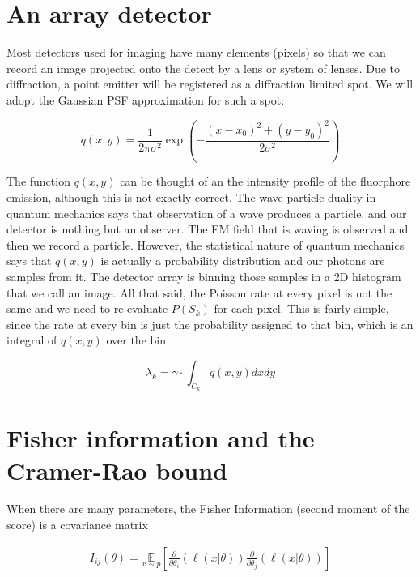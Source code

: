\documentclass{article}
\begin{document}
\section{An array detector}

Most detectors used for imaging have many elements (pixels) so that we can record an image projected onto the detect by a lens or system of lenses. Due to diffraction, a point emitter will be registered as a diffraction limited spot. We will adopt the Gaussian PSF approximation for such a spot:

\begin{equation*}
q(x,y) = \frac{1}{2\pi\sigma^{2}}\exp\left(-\frac{(x-x_{0})^{2}+(y-y_{0})^{2}}{2\sigma^{2}}\right)
\end{equation*}

The function $q(x,y)$ can be thought of an the intensity profile of the fluorphore emission, although this is not exactly correct. The wave particle-duality in quantum mechanics says that observation of a wave produces a particle, and our detector is nothing but an observer. The EM field that is waving is observed and then we record a particle. However, the statistical nature of quantum mechanics says that $q(x,y)$ is actually a probability distribution and our photons are samples from it. The detector array is binning those samples in a 2D histogram that we call an image. All that said, the Poisson rate at every pixel is not the same and we need to re-evaluate $P(S_{k})$ for each pixel. This is fairly simple, since the rate at every bin is just the probability assigned to that bin, which is an integral of $q(x,y)$ over the bin

\begin{equation*}
\lambda_{k} = \gamma\cdot\int_{C_{k}} q(x,y)dxdy
\end{equation*}

\section{Fisher information and the Cramer-Rao bound}

When there are many parameters, the Fisher Information (second moment of the score) is a covariance matrix

\begin{align*}
I_{ij}(\theta) = \underset{{x\sim p}}{\mathbb{E}}\left[\frac{\partial}{\partial\theta_{i}} \left(\ell(x|\theta)\right)\frac{\partial}{\partial\theta_{j}} \left(\ell(x|\theta)\right)\right]
\end{align*}
\end{document}
